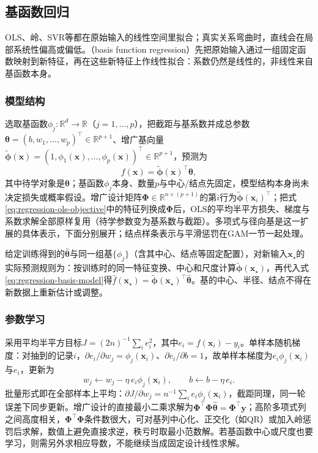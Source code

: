 \subsection{基函数回归}
\label{sec:regression-basis}

OLS、岭、SVR等都在原始输入的线性空间里拟合；真实关系弯曲时，直线会在局部系统性偏高或偏低。（basis function regression）先把原始输入通过一组固定函数映射到新特征，再在这些新特征上作线性拟合：系数仍然是线性的，非线性来自基函数本身。

\subsubsection{模型结构}
\label{sec:regression-basis-structure}

选取基函数$\phi_j:\mathbb{R}^d\to\mathbb{R}$（$j=1,\ldots,p$），把截距与基系数并成总参数$\bm{\theta}=(b,w_1,\ldots,w_p)^{\top}\in\mathbb R^{p+1}$、增广基向量$\widetilde{\bm{\phi}}(\bm{x})=(1,\phi_1(\bm{x}),\ldots,\phi_p(\bm{x}))^{\top}\in\mathbb R^{p+1}$，预测为
\begin{equation}
  f(\bm{x})=\widetilde{\bm{\phi}}(\bm{x})^{\top}\bm{\theta},
  \label{eq:regression-basis-model}
\end{equation}
其中待学对象是$\bm{\theta}$；基函数$\phi_j$本身、数量$p$与中心/结点先固定，模型结构本身尚未决定损失或概率假设。增广设计矩阵$\bm{\Phi}\in\mathbb{R}^{n\times(p+1)}$的第$i$行为$\widetilde{\bm{\phi}}(\bm{x}_i)^{\top}$；把式\eqref{eq:regression-ols-objective}中的特征列换成$\bm{\Phi}$后，OLS的平均半平方损失、梯度与系数求解全部原样复用（待学参数变为基系数与截距）。多项式与径向基是这一扩展的具体表示，下面分别展开；结点样条表示与平滑惩罚在GAM一节一起处理。

给定训练得到的$\widehat{\bm{\theta}}$与同一组基$\{\phi_j\}$（含其中心、结点等固定配置），对新输入$\bm{x}_\star$的实际预测规则为：按训练时的同一特征变换、中心和尺度计算$\widetilde{\bm{\phi}}(\bm{x}_\star)$，再代入式\eqref{eq:regression-basis-model}得$\widehat f(\bm{x}_\star)=\widetilde{\bm{\phi}}(\bm{x}_\star)^{\top}\widehat{\bm{\theta}}$。基的中心、半径、结点不得在新数据上重新估计或调整。

\subsubsection{参数学习}
\label{sec:regression-basis-learning}

采用平均半平方目标$J=(2n)^{-1}\sum_i e_i^2$，其中$e_i=f(\bm{x}_i)-y_i$。单样本随机梯度：对抽到的记录$i$，$\partial e_i/\partial w_j=\phi_j(\bm{x}_i)$、$\partial e_i/\partial b=1$，故单样本梯度为$e_i\phi_j(\bm{x}_i)$与$e_i$，更新为
\[
  w_j\leftarrow w_j-\eta\,e_i\phi_j(\bm{x}_i),
  \qquad
  b\leftarrow b-\eta\,e_i.
\]
批量形式即在全部样本上平均：$\partial J/\partial w_j=n^{-1}\sum_i e_i\phi_j(\bm{x}_i)$，截距同理，同一轮误差下同步更新。增广设计的直接最小二乘求解为$\bm{\Phi}^{\top}\bm{\Phi}\widehat{\bm{\theta}}=\bm{\Phi}^{\top}\bm{y}$；高阶多项式列之间高度相关，$\bm{\Phi}^{\top}\bm{\Phi}$条件数很大，可对基列中心化、正交化（如QR）或加入岭惩罚后求解，数值上避免直接求逆，秩亏时取最小范数解。若基函数中心或尺度也要学习，则需另外求相应导数，不能继续当成固定设计线性求解。

